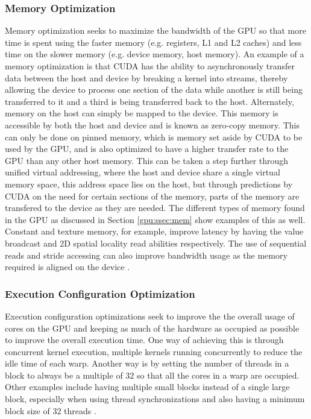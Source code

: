 \subsubsection{Memory Optimization}
Memory optimization seeks to maximize the bandwidth of the GPU so that more time is spent using the faster memory (e.g. registers, L1 and L2 caches) and less time on the slower memory (e.g. device memory, host memory). An example of a memory optimization is that CUDA has the ability to asynchronously transfer data between the host and device by breaking a kernel into streams, thereby allowing the device to process one section of the data while another is still being transferred to it and a third is being transferred back to the host. Alternately, memory on the host can simply be mapped to the device. This memory is accessible by both the host and device and is known as zero-copy memory. This can only be done on pinned memory, which is memory set aside by CUDA to be used by the GPU, and is also optimized to have a higher transfer rate to the GPU than any other host memory. This can be taken a step further through unified virtual addressing, where the host and device share a single virtual memory space, this address space lies on the host, but through predictions by CUDA on the need for certain sections of the memory, parts of the memory are transfered to the device as they are needed. The different types of memory found in the GPU as discussed in Section \ref{gpu:ssec:mem} show examples of this as well. Constant and texture memory, for example, improve latency by having the value broadcast and 2D spatial locality read abilities respectively. The use of sequential reads and stride accessing can also improve bandwidth usage as the memory required is aligned on the device \citep{CUDA}.
%
\subsubsection{Execution Configuration Optimization}
Execution configuration optimizations seek to improve the the overall usage of cores on the GPU and keeping as much of the hardware as occupied as possible to improve the overall execution time. One way of achieving this is through concurrent kernel execution, multiple kernels running concurrently to reduce the idle time of each warp. Another way is by setting the number of threads in a block to always be a multiple of 32 so that all the cores in a warp are occupied. Other examples include having multiple small blocks instead of a single large block, especially when using thread synchronizations and also having a minimum block size of 32 threads \citep{CUDA}.
%
